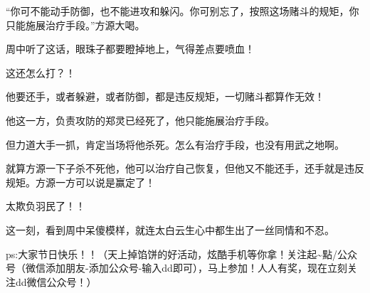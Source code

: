 \begin{this_body}
“你可不能动手防御，也不能进攻和躲闪。你可别忘了，按照这场赌斗的规矩，你只能施展治疗手段。”方源大喝。

周中听了这话，眼珠子都要瞪掉地上，气得差点要喷血！

这还怎么打？！

他要还手，或者躲避，或者防御，都是违反规矩，一切赌斗都算作无效！

他这一方，负责攻防的郑灵已经死了，他只能施展治疗手段。

但力道大手一抓，肯定当场将他杀死。怎么有治疗手段，也没有用武之地啊。

就算方源一下子杀不死他，他可以治疗自己恢复，但他又不能还手，还手就是违反规矩。方源一方可以说是赢定了！

太欺负羽民了！！

这一刻，看到周中呆傻模样，就连太白云生心中都生出了一丝同情和不忍。

ps:大家节日快乐！！（天上掉馅饼的好活动，炫酷手机等你拿！关注起\~{}點/公众号（微信添加朋友-添加公众号-输入dd即可），马上参加！人人有奖，现在立刻关注dd微信公众号！）

\end{this_body}

